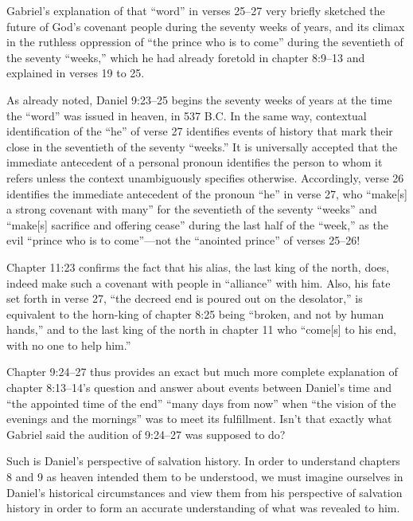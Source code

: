 Gabriel's explanation of that ``word'' in verses 25--27 very briefly sketched
the future of God's covenant people during the seventy weeks of years, and
its climax in the ruthless oppression of ``the prince who is to come'' during
the seventieth of the seventy ``weeks,'' which he had already foretold in
chapter 8:9--13 and explained in verses 19 to 
25.

As already noted, Daniel 9:23--25 begins the seventy weeks of years at the
time the ``word'' was issued in heaven, in 537 B.C. In the same way,
contextual identification of the ``he'' of verse 27 identifies events of
history that mark their close in the seventieth of the seventy ``weeks.'' It
is universally accepted that the immediate antecedent of a personal pronoun
identifies the person to whom it refers unless the context unambiguously
specifies otherwise. Accordingly, verse 26 identifies the immediate
antecedent of the pronoun ``he'' in verse 27, who ``make[s] a strong covenant
with many'' for the seventieth of the seventy ``weeks'' and ``make[s] sacrifice
and offering cease'' during the last half of the ``week,'' as the evil ``prince
who is to come''---not the ``anointed prince'' of verses 25--26! 

Chapter 11:23 confirms the fact that his alias, the last king of the north,
does, indeed make such a covenant with people in ``alliance'' with him. Also,
his fate set forth in verse 27, ``the decreed end is poured out on the
desolator,'' is equivalent to the horn-king of chapter 8:25 being ``broken,
and not by human hands,'' and to the last king of the north in chapter 11 who
``come[s] to his end, with no one to help him.'' 

Chapter 9:24--27 thus provides an exact but much more complete explanation of
chapter 8:13--14's question and answer about events between Daniel's time and
``the appointed time of the end'' ``many days from now'' when ``the vision of the
evenings and the mornings'' was to meet its 
fulfillment.
Isn't that exactly
what Gabriel said the audition of 9:24--27 was supposed to 
do? 

Such is Daniel's perspective of salvation history. In order to understand
chapters 8 and 9 as heaven intended them to be understood, we must imagine
ourselves in Daniel's historical circumstances and view them from his
perspective of salvation history in order to form an accurate understanding
of what was revealed to him.

